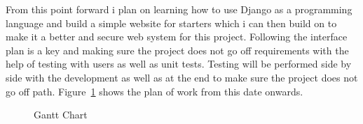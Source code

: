 \documentclass[../main.tex]{subfiles}
\begin{document}
\raggedright

From this point forward i plan on learning how to use Django as a programming language and build a simple website for starters which i can then build on to make it a better and secure web system for this project. Following the interface plan is a key and making sure the project does not go off requirements with the help of testing with users as well as unit tests. Testing will be performed side by side with the development as well as at the end to make sure the project does not go off path. Figure~\ref{fig:ganttchart} shows the plan of work from this date onwards. 

	\begin{figure}[h!]
        \caption{\label{fig:ganttchart} Gantt Chart}
      \end{figure}
\end{document}
